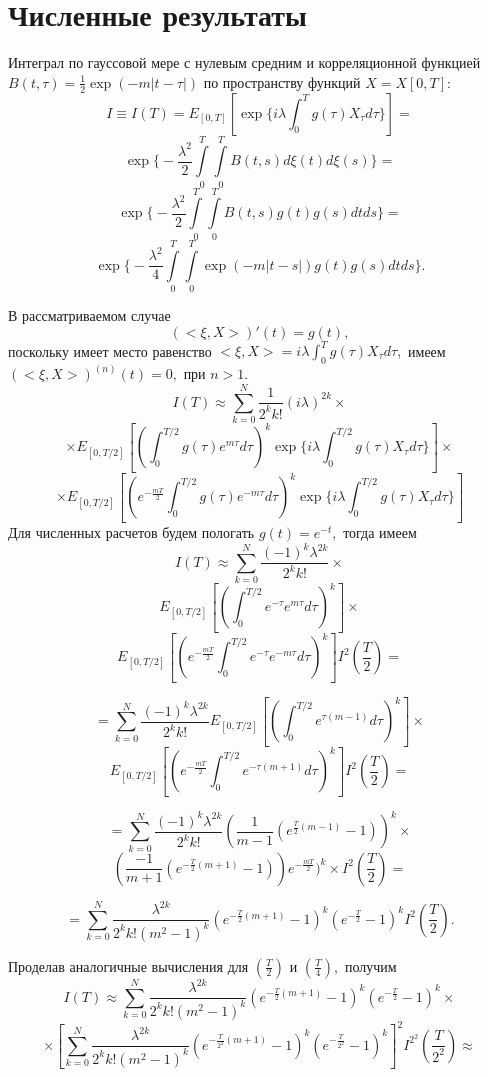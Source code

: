 \documentclass [12pt]{report}
\begin{document}
\chapter{Численные результаты}

Интеграл по гауссовой мере с нулевым средним и корреляционной функцией
$B(t,\tau) = \frac{1}{2}\exp(-m|t-\tau|)$
по пространству функций $X=X[0, T]:$
$$
I\equiv I(T) =
E_{[0,T]}[\exp\{i\lambda\int_{0}^{T}g(\tau)X_\tau d\tau\}] =
$$
$$
\exp\Big\{-\frac{\lambda^2}{2}\int\limits_0^T\int\limits_0^T
B(t,s)d\xi(t)d\xi(s)\Big\} =
$$
$$
\exp\Big\{-\frac{\lambda^2}{2}\int\limits_0^T\int\limits_0^T
B(t,s)g(t)g(s)dtds\Big\} =
$$
$$
\exp\Big\{-\frac{\lambda^2}{4}\int\limits_0^T\int\limits_0^T
\exp(-m|t-s|)g(t)g(s)dtds\Big\}.
$$

В рассматриваемом случае
$$
(<\xi,X>)'(t)= g(t),
$$
поскольку имеет место равенство
$<\xi, X> = i\lambda\int_{0}^{T}g(\tau)X_\tau d\tau , $
имеем $ (<\xi,X>)^{(n)}(t)= 0,$ при $ n > 1. $
$$
I(T)\approx \sum_{k=0}^{N}\frac{1}{2^k k!}(i\lambda)^{2k}\times
$$
$$
\times E_{[0,T/2]}[(\int_{0}^{T/2}g(\tau)e^{m\tau}d\tau)^k
\exp\{i\lambda\int_{0}^{T/2}g(\tau)X_\tau d\tau\}]\times
$$
$$
\times E_{[0,T/2]}[(e^{-\frac{mT}{2}}\int_{0}^{T/2}g(\tau)e^{-m\tau}d\tau)^k
\exp\{i\lambda\int_{0}^{T/2}g(\tau)X_\tau d\tau\}]
$$
Для численных расчетов будем пологать $g(t) = e^{-t},$ тогда имеем
$$
I(T)\approx \sum_{k=0}^{N} \frac{(-1)^k\lambda^{2k}} {2^k k!} \times
$$
$$
E_{[0,T/2]}[(\int_{0}^{T/2}e^{-\tau}e^{m\tau}d\tau)^k] \times
$$
$$
E_{[0,T/2]}[(e^{-\frac{mT}{2}}\int_{0}^{T/2}e^{-\tau}e^{-m\tau}d\tau)^k]
I^2(\frac{T}{2})=
$$

$$
= \sum_{k=0}^{N} \frac{(-1)^k\lambda^{2k}} {2^k k!}
E_{[0,T/2]}[(\int_{0}^{T/2}e^{\tau(m-1)}d\tau)^k] \times
$$
$$
E_{[0,T/2]}[(e^{-\frac{mT}{2}}\int_{0}^{T/2}e^{-\tau(m+1)}d\tau)^k]
I^2(\frac{T}{2}) =
$$

$$
= \sum_{k=0}^{N} \frac{(-1)^k\lambda^{2k}} {2^k k!}
(\frac{1}{m-1}(e^{\frac{T}{2}(m-1)} - 1))^k \times
$$
$$
(\frac{-1}{m+1}(e^{-\frac{T}{2}(m+1)} - 1)) e^{-\frac{mT}{2}})^k
\times I^2(\frac{T}{2}) =
$$

$$
= \sum_{k=0}^{N} \frac{\lambda^{2k}} {2^k k! (m^2 - 1)^k}
(e^{-\frac{T}{2}(m+1)} - 1)^k (e^{-\frac{T}{2}} - 1)^k
I^2(\frac{T}{2}).
$$

Проделав аналогичные вычисления для $(\frac{T}{2})$
и $(\frac{T}{4}),$ получим
$$
I(T)\approx \sum_{k=0}^{N} \frac{\lambda^{2k}} {2^k k! (m^2 - 1)^k}
(e^{-\frac{T}{2}(m+1)} - 1)^k (e^{-\frac{T}{2}} - 1)^k \times
$$
$$
\times[ \sum_{k=0}^{N} \frac{\lambda^{2k}} {2^k k! (m^2 - 1)^k}
(e^{-\frac{T}{2^2}(m+1)} - 1)^k (e^{-\frac{T}{2^2}} - 1)^k
]^2 I^{2^2}(\frac{T}{2^2}) \approx
$$
\end{document}
